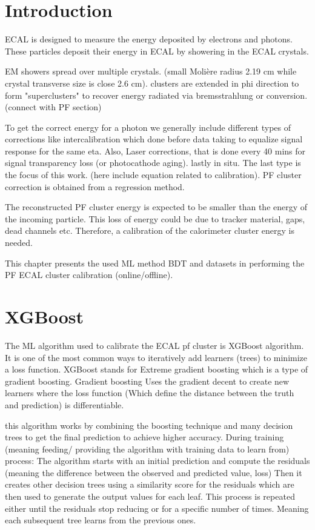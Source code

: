 
\section{Introduction}

ECAL is designed to measure the energy deposited by electrons and photons. These particles deposit their energy in ECAL by showering in the ECAL crystals.

EM showers spread over multiple crystals. (small Molière radius 2.19 cm while crystal transverse size is close 2.6 cm). clusters are extended in phi direction to form "superclusters" to recover energy radiated via bremsstrahlung or conversion. (connect with PF section)

To get the correct energy for a photon we generally include different types of corrections like intercalibration which done before data taking to equalize signal response for the same eta. Also, Laser corrections, that is done every 40 mins for signal transparency loss (or photocathode aging). lastly in situ. The last type is the focus of this work. (here include equation related to calibration). PF cluster correction is obtained from a regression method.

The reconstructed PF cluster energy is expected to be smaller than the energy of the incoming particle. This loss of energy could be due to tracker material, gaps, dead channels etc. Therefore, a calibration of the calorimeter cluster energy is needed.

This chapter presents the used ML method BDT and datasets in performing the PF ECAL cluster calibration (online/offline). 


\section{XGBoost} %

The ML algorithm used to calibrate the ECAL pf cluster is XGBoost algorithm. It is one of the most common ways to iteratively add learners (trees) to minimize a loss function. XGBoost stands for Extreme gradient boosting which is a type of gradient boosting. Gradient boosting Uses the gradient decent to create new learners where the loss function (Which define the distance between the truth and prediction) is differentiable. %

this algorithm works by combining the boosting technique and many decision trees to get the final prediction to achieve higher accuracy.
During training (meaning feeding/ providing the algorithm with training data to learn from) process: The algorithm starts with an initial prediction and compute the residuals (meaning the difference between the observed and predicted value, loss) Then it creates other decision trees using a similarity score for the residuals %
which are then used to generate the output values for each leaf.  This process is repeated either until the residuals stop reducing or for a specific number of times. Meaning each subsequent tree learns from the previous ones.

